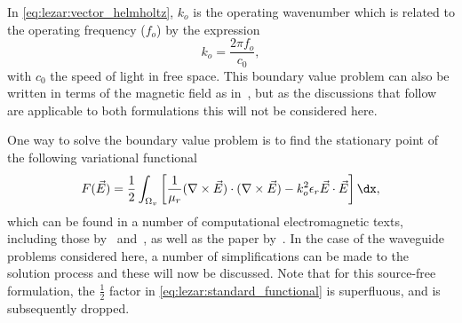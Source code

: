 In \eqref{eq:lezar:vector_helmholtz}, $k_o$ is the operating
wavenumber which is related to the
operating frequency ($f_o$) by the expression
\begin{equation}
  \label{eq:lezar:operating_wavenumber}
 k_o = \frac{2\pi f_o}{c_0},
\end{equation}
with $c_0$ the speed of light in free space.  This boundary value
problem can also be written in terms of the magnetic field as
in~\citet{Jin2002}, but as the discussions that follow are applicable
to both formulations this will not be considered here.

One way to solve the boundary value problem is to find the stationary
point of the following variational functional
\begin{equation}
  \label{eq:lezar:standard_functional}
  F(\vec{E}) = \frac{1}{2}\int_{\Omega_v} \left[ \frac{1}{\mu_r}(\nabla\times{\vec{E}})\cdot(\nabla\times{\vec{E}}) - k_o^2\epsilon_r\vec{E}\cdot{\vec{E}} \right] \dx,
\end{equation}
which can be found in a number of computational electromagnetic texts,
including those by~\citet{Jin2002}
and~\citet{PelosiCoccioliSelleri1998}, as well as the paper
by~\citet{LeeSunCendes1991}. In the case of the waveguide problems
considered here, a number of simplifications can be made to the
solution process and these will now be discussed. Note that for this
source-free formulation, the $\frac{1}{2}$ factor
in \eqref{eq:lezar:standard_functional} is superfluous, and is
subsequently dropped.

